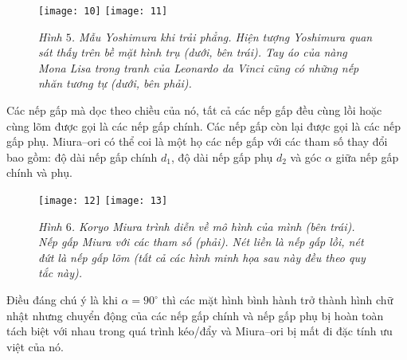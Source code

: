 \begin{multicols}{2}
\begin{figure}[H]
		\vspace*{4pt}
		\texttt{[image: 10]}\hspace*{3pt}
		\texttt{[image: 11]}
		\caption{\small\textit{\color{toanhocdoisong}Hình $5$. Mẫu Yoshimura khi trải phẳng. Hiện tượng Yoshimura quan sát thấy trên bề mặt hình trụ (dưới, bên trái). Tay áo của nàng Mona Lisa trong tranh của Leonardo da Vinci cũng có những nếp nhăn tương tự (dưới, bên phải).}}
		\vspace*{-10pt}
	\end{figure}
	Các nếp gấp mà dọc theo chiều của nó, tất cả các nếp gấp đều cùng lồi hoặc cùng lõm được gọi là các nếp gấp chính. Các nếp gấp còn lại được gọi là các nếp gấp phụ. Miura--ori có thể coi là một họ các nếp gấp với các tham số thay đổi bao gồm: độ dài nếp gấp chính $d_1$, độ dài nếp gấp phụ $d_2$ và góc $\alpha$ giữa nếp gấp chính và phụ. 
	
	\begin{figure}[H]
		\vspace*{-5pt}
		\centering
		\captionsetup{labelformat= empty, justification=centering}
		\texttt{[image: 12]}
		\texttt{[image: 13]}
		\caption{\small\textit{\color{toanhocdoisong}Hình $6$. Koryo Miura trình diễn về mô hình của mình (bên trái). Nếp gấp Miura với các tham số (phải). Nét liền là nếp gấp lồi, nét đứt là nếp gấp lõm (tất cả các hình minh họa sau này đều theo quy tắc này).}}
		\vspace*{-5pt}
	\end{figure}
	Điều đáng chú ý là khi $\alpha =90^\circ$ thì các mặt hình bình hành trở thành hình chữ nhật nhưng chuyển động của các nếp gấp chính và nếp gấp phụ bị hoàn toàn tách biệt với nhau trong quá trình kéo/đẩy và Miura--ori bị mất đi đặc tính ưu việt của nó.
	

\end{multicols}
